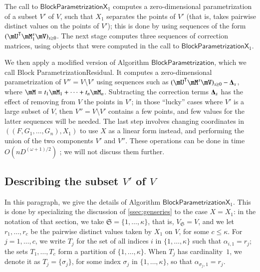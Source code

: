 \documentclass[final,1p,times,authoryear]{elsarticle}
\newcommand{\mat}[1]{\bm{\MakeUppercase{#1}}} %
\newcommand{\mainalgoname}{\mathsf{ BlockParametrization}}
\newcommand{\lf}{X}
\newcommand{\trsp}[1]{#1^{\mathsf{T}}} %
\def\dg{\kappa}
\newcommand{\mUt}{\trsp{\mU}}
\begin{document}
The call to $\mathsf{BlockParametrizationX}_1$ computes a zero-dimensional
parametrization of a subset $V'$ of $V$, such that $X_1$ separates the
points of $V'$ (that is, takes pairwise distinct values on the points
of $V'$); this is done by using sequences of the form $(\mUt
\mM_1^s \mV)_{s \ge 0}$. The next stage computes three 
sequences of correction matrices, using objects that were computed 
in the call to  $\mathsf{BlockParametrizationX}_1$.

We then apply a modified version of Algorithm $\mainalgoname$, which we call
{\sf Block} {\sf ParametrizationResidual}. It computes a zero-dimensional
parametrization of $V''=V\setminus V'$ using sequences such as $(\mUt
\mM^s \mV)_{s \ge 0} - \mat{\Delta}_s$, where $\mM= t_1 \mM_1 + \cdots
+ t_n \mM_n$. Subtracting the correction terms $\mat{\Delta}_s$ has
the effect of removing from $V$ the points in $V'$; in those ``lucky''
cases where $V'$ is a large subset of $V$, then $V''=V\setminus V'$ contains
a few points, and few values for the latter sequences will be needed.
The last step involves changing coordinates in $((F,G_1,\dots,G_n),X_1)$ to use
$\lf$ as a linear form instead, and performing the union of the two components
$V'$ and $V''$. These operations can be done in time $O(n D^{(\omega+1)/2})$
\citep[Lemmas~2 \&~3]{PoSc13b}; we will not discuss them further.



\subsection{Describing the subset \texorpdfstring{$V'$}{V'} of \texorpdfstring{$V$}{V}}

In this paragraph, we give the details of Algorithm
$\mathsf{BlockParametrizationX}_1$. This is done by specializing the
discussion of \cref{ssec:genseries} to the case $\lf=X_1$:
in the notation of that section, we take
$\mathfrak{S}=\{1,\dots,\dg\}$, that is, $V_{\mathfrak{S}}=V$, and we
let $r_1,\dots,r_c$ be the pairwise distinct values taken by $X_1$ on
$V$, for some $c \le \dg$.  For $j=1,\dots,c$, we write $T_j$ for the
set of all indices $i$ in $\{1,\dots,\dg\}$ such that
$\alpha_{i,1}=r_j$; the sets $T_1,\dots,T_c$ form a partition of
$\{1,\dots,\dg\}$. When $T_j$ has cardinality~$1$, we denote it as
$T_j=\{\sigma_j\}$, for some index $\sigma_j$ in $\{1,\dots,\dg\}$, so
that $\alpha_{\sigma_j,1}=r_j$.
\end{document}
